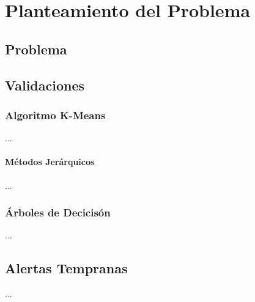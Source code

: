 \chapter{Planteamiento del Problema}
\label{chap:planteamientoproblema}

\section{Problema}


\section{Validaciones}
\subsection{Algoritmo K-Means}

...

\subsubsection{Métodos Jerárquicos}

...


\subsection{Árboles de Decicisón}

...


\section{Alertas Tempranas}
...





\clearemptydoublepage